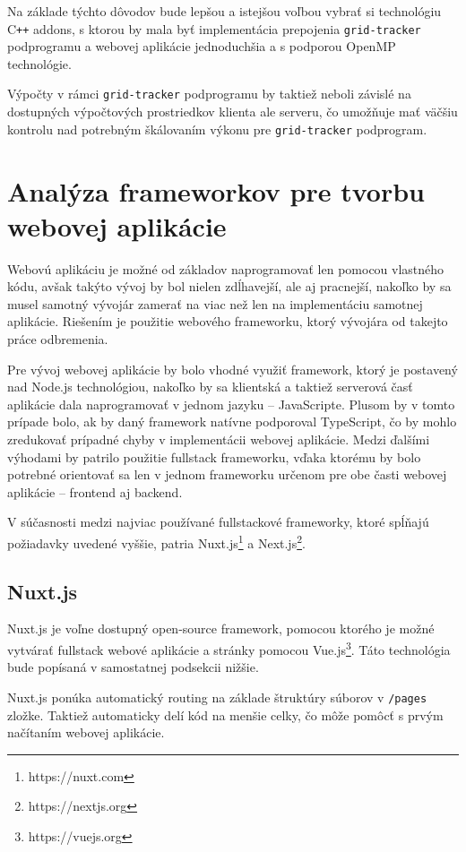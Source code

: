 Na základe týchto dôvodov bude lepšou a istejšou voľbou vybrať si technológiu C\texttt{++} addons, s ktorou by mala byť implementácia prepojenia \texttt{grid-tracker} podprogramu a webovej aplikácie jednoduchšia a s podporou OpenMP technológie.

\clearpage
Výpočty v rámci \texttt{grid-tracker} podprogramu by taktiež neboli závislé na dostupných výpočtových prostriedkov klienta ale serveru, čo umožňuje mať väčšiu kontrolu nad potrebným škálovaním výkonu pre \texttt{grid-tracker} podprogram.

\section {Analýza frameworkov pre tvorbu webovej aplikácie}
Webovú aplikáciu je možné od základov naprogramovať len pomocou vlastného kódu, avšak takýto vývoj by bol nielen zdĺhavejší, ale aj pracnejší, nakoľko by sa musel samotný vývojár zamerať na viac než len na implementáciu samotnej aplikácie. Riešením je použitie webového frameworku, ktorý vývojára od takejto práce odbremenia. 

Pre vývoj webovej aplikácie by bolo vhodné využiť framework, ktorý je postavený nad Node.js technológiou, nakoľko by sa klientská a taktiež serverová časť aplikácie dala naprogramovať v jednom jazyku -- JavaScripte. Plusom by v tomto prípade bolo, ak by daný framework natívne podporoval TypeScript, čo by mohlo zredukovať prípadné chyby v implementácii webovej aplikácie.
Medzi ďalšími výhodami by patrilo použitie fullstack frameworku, vďaka ktorému by bolo potrebné orientovať sa len v jednom frameworku určenom pre obe časti webovej aplikácie -- frontend aj backend.

V súčasnosti medzi najviac používané fullstackové frameworky, ktoré spĺňajú požiadavky uvedené vyššie, patria Nuxt.js\footnote{https://nuxt.com} a Next.js\footnote{https://nextjs.org}.

\subsection {Nuxt.js}
Nuxt.js je voľne dostupný open-source framework, pomocou ktorého je možné vytvárať fullstack webové aplikácie a stránky pomocou Vue.js\footnote{https://vuejs.org}. Táto technológia bude popísaná v samostatnej podsekcii nižšie.

Nuxt.js ponúka automatický routing na základe štruktúry súborov v \texttt{/pages} zložke. Taktiež automaticky delí kód na menšie celky, čo môže pomôcť s prvým načítaním webovej aplikácie.

